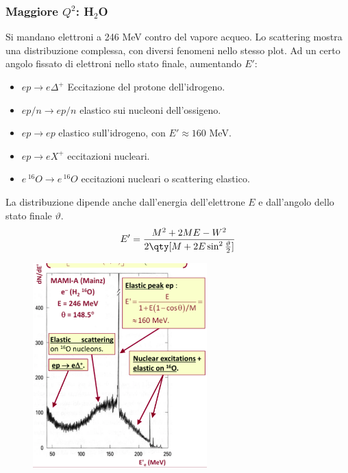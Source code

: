\subsubsection{Maggiore $Q^2$: H$_2$O}
Si mandano elettroni a 246 MeV contro del vapore acqueo. Lo scattering mostra una distribuzione complessa, con diversi fenomeni nello stesso plot. Ad un certo angolo fissato di elettroni nello stato finale, aumentando $E'$:
\begin{itemize}
    \item $ep\to e\Delta^+$ Eccitazione del protone dell'idrogeno.
    \item $ep/n\to ep/n$ elastico sui nucleoni dell'ossigeno.
    \item $ep\to ep$ elastico sull'idrogeno, con $E'\approx160$ MeV.
    \item $ep\to eX^+$ eccitazioni nucleari.
    \item $e\,^{16}O\to e\,^{16}O$ eccitazioni nucleari o scattering elastico.
\end{itemize}
La distribuzione dipende anche dall'energia dell'elettrone $E$ e dall'angolo dello stato finale $\vartheta$.
\begin{equation*}
    E'=\frac{M^2+2ME-W^2}{2\qty[M+2E\sin^2\frac\vartheta2]}
\end{equation*}
\begin{figure}[H]
    \centering
    \includegraphics[width=0.6\textwidth]{immagini/fig_higher_q2_water.png}
\end{figure}
